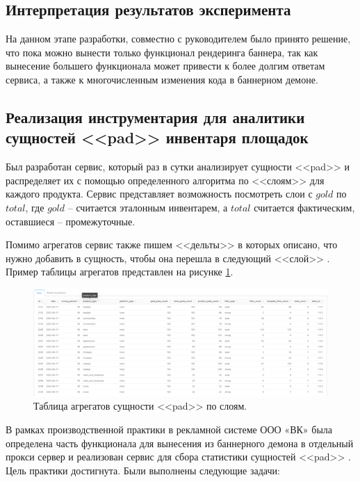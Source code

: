 \subsection{Интерпретация результатов эксперимента}

На данном этапе разработки, совместно с руководителем было принято решение, что пока можно вынести только функционал рендеринга баннера, так как вынесение большего функционала может привести к более долгим ответам сервиса, а также к многочисленным изменения кода в баннерном демоне.

\subsection{Реализация инструментария для аналитики сущностей <<pad>> инвентаря площадок}
Был разработан сервис, который раз в сутки анализирует сущности <<pad>> и распределяет их с помощью определенного алгоритма по <<слоям>> для каждого продукта. Сервис представляет возможность посмотреть слои с $gold$ по $total$, где $gold$ -- считается эталонным инвентарем, а $total$ считается фактическим, оставшиеся -- промежуточные. 

Помимо агрегатов сервис также пишем <<дельты>> в которых описано, что нужно добавить в сущность, чтобы она перешла в следующий <<слой>> . Пример таблицы агрегатов представлен на рисунке \ref{fig:agregates}.

\begin{figure}[hbtp]
	\centering
	\includegraphics[width=\textwidth]{inc/agregates}
	\caption{Таблица агрегатов сущности <<pad>> по слоям.}
	\label{fig:agregates}
\end{figure}
\clearpage

В рамках производственной практики в рекламной системе ООО «ВК» была определена часть функционала для вынесения из баннерного демона в отдельный прокси сервер и реализован сервис для сбора статистики сущностей <<pad>> . Цель практики достигнута. Были выполнены следующие задачи:

